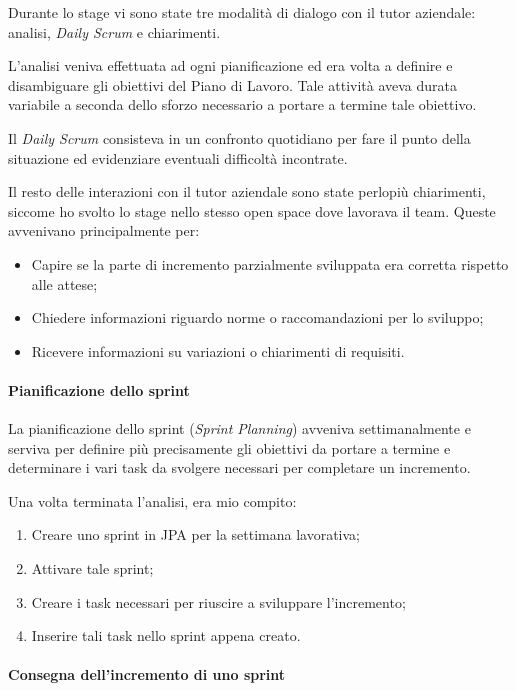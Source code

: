 Durante lo stage vi sono state tre modalità di dialogo con il tutor aziendale:
analisi, \emph{Daily Scrum} e chiarimenti.

L'analisi veniva effettuata ad ogni pianificazione ed era volta a definire e
disambiguare gli obiettivi del Piano di Lavoro. Tale attività aveva durata
variabile a seconda dello sforzo necessario a portare a termine tale obiettivo.

Il \emph{Daily Scrum} consisteva in un confronto quotidiano per fare il punto
della situazione ed evidenziare eventuali difficoltà incontrate.

Il resto delle interazioni con il tutor aziendale sono state perlopiù
chiarimenti, siccome ho svolto lo stage nello stesso open space dove lavorava
il team. Queste avvenivano principalmente per:

\begin{itemize}
\item Capire se la parte di incremento parzialmente sviluppata era corretta
  rispetto alle attese;
\item Chiedere informazioni riguardo norme o raccomandazioni per lo sviluppo;
\item Ricevere informazioni su variazioni o chiarimenti di requisiti.
\end{itemize}

\paragraph{Pianificazione dello sprint} \mbox{}

La pianificazione dello sprint (\emph{Sprint Planning}) avveniva
settimanalmente e serviva per definire più precisamente gli obiettivi da portare a termine e determinare i vari task da svolgere necessari per
completare un incremento.

Una volta terminata l'analisi, era mio compito:

\begin{enumerate}
\item Creare uno sprint in JPA per la settimana lavorativa;
\item Attivare tale sprint;
\item Creare i task necessari per riuscire a sviluppare l'incremento;
\item Inserire tali task nello sprint appena creato.
\end{enumerate}

\paragraph{Consegna dell'incremento di uno sprint} \mbox{}

